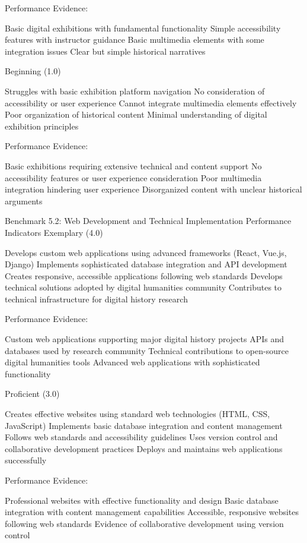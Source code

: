 \begin{appendices}
Performance Evidence:

Basic digital exhibitions with fundamental functionality
Simple accessibility features with instructor guidance
Basic multimedia elements with some integration issues
Clear but simple historical narratives

Beginning (1.0)

Struggles with basic exhibition platform navigation
No consideration of accessibility or user experience
Cannot integrate multimedia elements effectively
Poor organization of historical content
Minimal understanding of digital exhibition principles

Performance Evidence:

Basic exhibitions requiring extensive technical and content support
No accessibility features or user experience consideration
Poor multimedia integration hindering user experience
Disorganized content with unclear historical arguments

Benchmark 5.2: Web Development and Technical Implementation
Performance Indicators
Exemplary (4.0)

Develops custom web applications using advanced frameworks (React, Vue.js, Django)
Implements sophisticated database integration and API development
Creates responsive, accessible applications following web standards
Develops technical solutions adopted by digital humanities community
Contributes to technical infrastructure for digital history research

Performance Evidence:

Custom web applications supporting major digital history projects
APIs and databases used by research community
Technical contributions to open-source digital humanities tools
Advanced web applications with sophisticated functionality

Proficient (3.0)

Creates effective websites using standard web technologies (HTML, CSS, JavaScript)
Implements basic database integration and content management
Follows web standards and accessibility guidelines
Uses version control and collaborative development practices
Deploys and maintains web applications successfully

Performance Evidence:

Professional websites with effective functionality and design
Basic database integration with content management capabilities
Accessible, responsive websites following web standards
Evidence of collaborative development using version control


\end{appendices}
